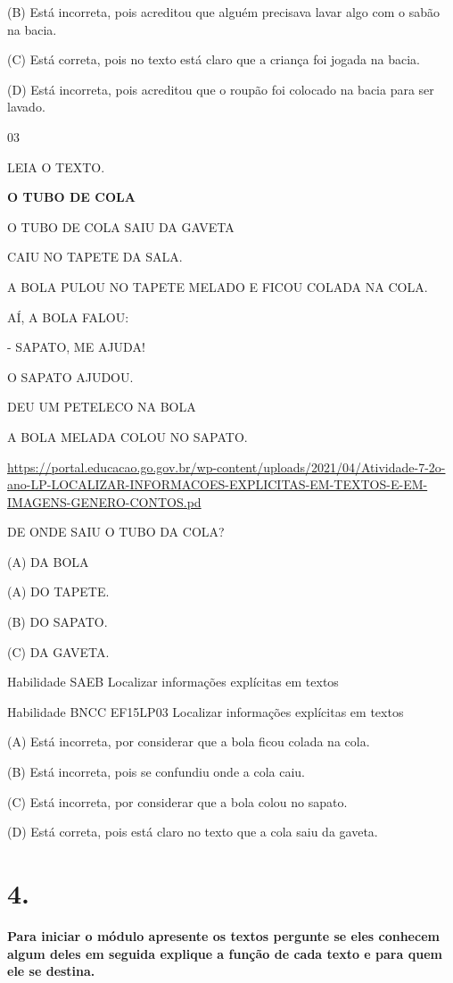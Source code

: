 {{(B) Está incorreta, pois acreditou que alguém precisava lavar algo com o
sabão na bacia.

(C) Está correta, pois no texto está claro que a criança foi jogada na
bacia.

(D) Está incorreta, pois acreditou que o roupão foi colocado na bacia
para ser lavado.

\num{03}

LEIA O TEXTO.

\textbf{O TUBO DE COLA}

O TUBO DE COLA SAIU DA GAVETA

CAIU NO TAPETE DA SALA.

A BOLA PULOU NO TAPETE MELADO E FICOU COLADA NA COLA.

AÍ, A BOLA FALOU:

- SAPATO, ME AJUDA!

O SAPATO AJUDOU.

DEU UM PETELECO NA BOLA

A BOLA MELADA COLOU NO SAPATO.

\url{https://portal.educacao.go.gov.br/wp-content/uploads/2021/04/Atividade-7-2o-ano-LP-LOCALIZAR-INFORMACOES-EXPLICITAS-EM-TEXTOS-E-EM-IMAGENS-GENERO-CONTOS.pd}

DE ONDE SAIU O TUBO DA COLA?

(A) DA BOLA

(A) DO TAPETE.

(B) DO SAPATO.

(C) DA GAVETA.

Habilidade SAEB Localizar informações explícitas em textos

Habilidade BNCC EF15LP03 Localizar informações explícitas em textos

(A) Está incorreta, por considerar que a bola ficou colada na cola.

(B) Está incorreta, pois se confundiu onde a cola caiu.

(C) Está incorreta, por considerar que a bola colou no sapato.

(D) Está correta, pois está claro no texto que a cola saiu da gaveta.

\chapter{4.}

\textbf{Para iniciar o módulo apresente os textos pergunte se eles
conhecem algum deles em seguida explique a função de cada texto e para
quem ele se destina.}

}}

